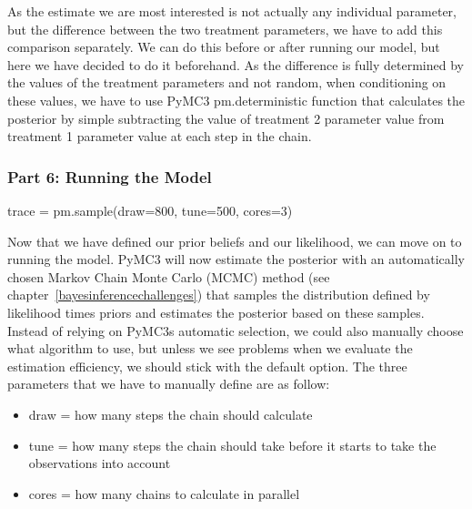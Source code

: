 \documentclass[12pt,a4paper,leqno]{report}
\theoremstyle{plain}
\theoremstyle{definition}
\theoremstyle{remark}
\begin{document}
As the estimate we are most interested is not actually any individual parameter, but the
difference between the two treatment parameters, we have to add this comparison separately.
We can do this before or after running our model, but here we have decided to do it
beforehand. As the difference is fully determined by the values of the treatment
parameters and not random, when conditioning on these values, we have to use PyMC3
pm.deterministic function that calculates the posterior
by simple subtracting the value of treatment 2 parameter value from treatment 1
parameter value at each step in the chain.

\subsubsection*{Part 6: Running the Model}

\bigskip
\begin{pyverbatim}[][fontsize=\footnotesize]
    trace = pm.sample(draw=800, tune=500, cores=3)
\end{pyverbatim}
\smallskip

Now that we have defined our prior beliefs and our likelihood, we can move on to running the
model. PyMC3 will now estimate the posterior with an automatically chosen Markov Chain
Monte Carlo (MCMC) method (see chapter\ \ref{bayesinferencechallenges})
that samples the distribution defined by likelihood times priors and estimates the
posterior based on these samples. Instead of relying on PyMC3s automatic selection, we could also manually choose what
algorithm to use, but unless we see problems when we evaluate the estimation efficiency,
we should stick with the default option. The three parameters that we have to manually define are as follow:

\begin{itemize}
    \item[] draw = how many steps the chain should calculate
    \item[] tune = how many steps the chain should take before it starts to
    take the observations into account
    \item[] cores = how many chains to calculate in parallel
\end{itemize}
\end{document}
